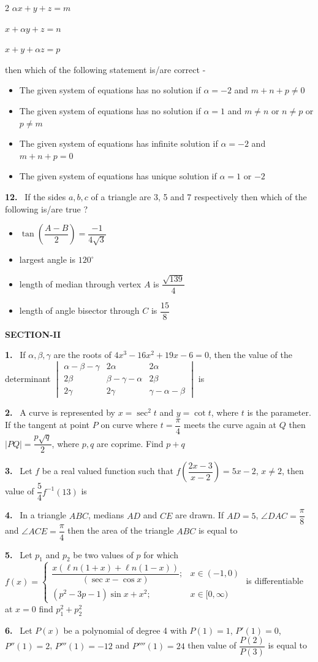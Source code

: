 \documentclass[10pt]{extarticle}
\newcommand{\sect}[1]{\par\smallskip\noindent\textbf{#1}\par}
\newcommand{\qn}[1]{\par\smallskip\noindent\textbf{#1.}~}
\newenvironment{qoptions}{\begin{itemize}[leftmargin=1.8em,itemsep=1pt,topsep=2pt,label={}]}{\end{itemize}}
\newcommand{\opt}[2]{\item[(#1)] #2}
\begin{document}
\begin{multicols}{2}
$\alpha x+y+z=m$

$x+\alpha y+z=n$

$x+y+\alpha z=p$

then which of the following statement is/are correct -
\begin{qoptions}
\opt{A}{The given system of equations has no solution if $\alpha=-2$ and $m+n+p\neq0$}
\opt{B}{The given system of equations has no solution if $\alpha=1$ and $m\neq n$ or $n\neq p$ or $p\neq m$}
\opt{C}{The given system of equations has infinite solution if $\alpha=-2$ and $m+n+p=0$}
\opt{D}{The given system of equations has unique solution if $\alpha=1$ or $-2$}
\end{qoptions}
\qn{12} If the sides $a,b,c$ of a triangle are 3, 5 and 7 respectively then which of the following is/are true ?
\begin{qoptions}
\opt{A}{$\tan\left(\dfrac{A-B}2\right)=\dfrac{-1}{4\sqrt3}$}
\opt{B}{largest angle is $120^\circ$}
\opt{C}{length of median through vertex $A$ is $\dfrac{\sqrt{139}}4$}
\opt{D}{length of angle bisector through $C$ is $\dfrac{15}8$}
\end{qoptions}
\sect{SECTION-II}
\qn{1} If $\alpha,\beta,\gamma$ are the roots of $4x^3-16x^2+19x-6=0$, then the value of the determinant $\begin{vmatrix}\alpha-\beta-\gamma&2\alpha&2\alpha\\2\beta&\beta-\gamma-\alpha&2\beta\\2\gamma&2\gamma&\gamma-\alpha-\beta\end{vmatrix}$ is
\qn{2} A curve is represented by $x=\sec^2t$ and $y=\cot t$, where $t$ is the parameter. If the tangent at point $P$ on curve where $t=\dfrac\pi4$ meets the curve again at $Q$ then $|PQ|=\dfrac{p\sqrt q}2$, where $p,q$ are coprime. Find $p+q$
\qn{3} Let $f$ be a real valued function such that $f\left(\dfrac{2x-3}{x-2}\right)=5x-2$, $x\neq2$, then value of $\dfrac54f^{-1}(13)$ is
\qn{4} In a triangle $ABC$, medians $AD$ and $CE$ are drawn. If $AD=5$, $\angle DAC=\dfrac\pi8$ and $\angle ACE=\dfrac\pi4$ then the area of the triangle $ABC$ is equal to
\qn{5} Let $p_1$ and $p_2$ be two values of $p$ for which $f(x)=\begin{cases}\dfrac{x(\ell n(1+x)+\ell n(1-x))}{(\sec x-\cos x)};&x\in(-1,0)\\(p^2-3p-1)\sin x+x^2;&x\in[0,\infty)\end{cases}$ is differentiable at $x=0$ find $p_1^2+p_2^2$
\qn{6} Let $P(x)$ be a polynomial of degree 4 with $P(1)=1$, $P'(1)=0$, $P''(1)=2$, $P'''(1)=-12$ and $P''''(1)=24$ then value of $\dfrac{P(2)}{P(3)}$ is equal to
\end{multicols}
\end{document}
